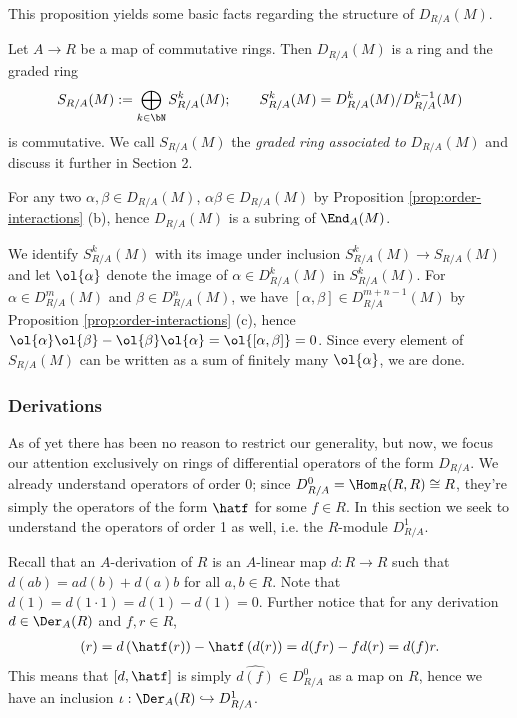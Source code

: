 This proposition yields some basic facts regarding the structure of $D_{R/A}(M)$.
\begin{cor}\label{cor:assoc-graded-ring-com}
	Let $A \to R$ be a map of commutative rings. Then $D_{R/A}(M)$ is a ring and the graded ring 
	\begin{align*}
		S_{R/A}(M) := \bigoplus_{k \in \bN}S^k_{R/A}(M); \hspace{2em} S^k_{R/A}(M) = D^k_{R/A}(M)/D^{k-1}_{R/A}(M)
	\end{align*}
	is commutative. We call $S_{R/A}(M)$ the \emph{graded ring associated to} $D_{R/A}(M)$ and discuss it further in Section 2. 
\end{cor}
\begin{prf}
	For any two $\alpha,\beta \in D_{R/A}(M)$, $\alpha \beta \in D_{R/A}(M)$ by Proposition \ref{prop:order-interactions} (b), hence $D_{R/A}(M)$ is a subring of $\End_A(M)$.

	We identify $S^k_{R/A}(M)$ with its image under inclusion $S^k_{R/A}(M) \to S_{R/A}(M)$ and let $\ol{\alpha}$ denote the image of $\alpha \in D^k_{R/A}(M)$ in $S^k_{R/A}(M)$. For $\alpha \in D^m_{R/A}(M)$ and $\beta \in D^n_{R/A}(M)$, we have $[\alpha,\beta] \in D^{m+n-1}_{R/A}(M)$ by Proposition \ref{prop:order-interactions} (c), hence $\ol{\alpha}\ol{\beta} - \ol{\beta}\ol{\alpha} = \ol{[\alpha,\beta]} = 0$. Since every element of $S_{R/A}(M)$ can be written as a sum of finitely many $\ol{\alpha}$, we are done.
\end{prf}

\subsubsection{Derivations}
As of yet there has been no reason to restrict our generality, but now, we focus our attention exclusively on rings of differential operators of the form $D_{R/A}$. We already understand operators of order 0; since $D^0_{R/A} = \Hom_R(R,R) \cong R$, they're simply the operators of the form $\hatf$ for some $f\in R$. In this section we seek to understand the operators of order 1 as well, i.e. the $R$-module $D^1_{R/A}$.

Recall that an $A$-derivation of $R$ is an $A$-linear map $d:R\to R$ such that $d(ab) = ad(b) + d(a)b$ for all $a,b\in R$. Note that $d(1) = d(1\cdot 1) = d(1) - d(1) = 0$. Further notice that for any derivation $d \in \Der_A(R)$ and $f,r \in R$,
\begin{align*}
	[d,\hatf](r) = d\left(\hatf(r)\right) - \hatf\left(d(r)\right) = d(fr) - fd(r) = d(f)r.
\end{align*}
This means that $[d,\hatf]$ is simply $\widehat{d(f)} \in D^0_{R/A}$ as a map on $R$, hence we have an inclusion $\iota: \Der_A(R) \hookrightarrow D^1_{R/A}$.

